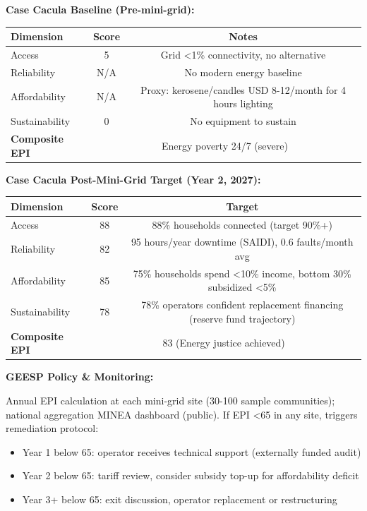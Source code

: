 \documentclass[12pt, a4paper]{article}
\begin{document}
\textbf{Case Cacula Baseline (Pre-mini-grid):}

\begin{center}
\begin{tabular}{lcc}
\toprule
\rowcolor{LightBlue}\textbf{Dimension} & \textbf{Score} & \textbf{Notes} \\
\midrule
Access & 5 & Grid <1\% connectivity, no alternative \\
Reliability & N/A & No modern energy baseline \\
Affordability & N/A & Proxy: kerosene/candles USD 8-12/month for 4 hours lighting \\
Sustainability & 0 & No equipment to sustain \\
\midrule
\textbf{Composite EPI} & \multicolumn{2}{c}{Energy poverty 24/7 (severe)} \\
\bottomrule
\end{tabular}
\end{center}

\textbf{Case Cacula Post-Mini-Grid Target (Year 2, 2027):}

\begin{center}
\begin{tabular}{lcc}
\toprule
\rowcolor{LightBlue}\textbf{Dimension} & \textbf{Score} & \textbf{Target} \\
\midrule
Access & 88 & 88\% households connected (target 90\%+) \\
Reliability & 82 & 95 hours/year downtime (SAIDI), 0.6 faults/month avg \\
Affordability & 85 & 75\% households spend <10\% income, bottom 30\% subsidized <5\% \\
Sustainability & 78 & 78\% operators confident replacement financing (reserve fund trajectory) \\
\midrule
\textbf{Composite EPI} & \multicolumn{2}{c}{83 (Energy justice achieved)} \\
\bottomrule
\end{tabular}
\end{center}

\textbf{GEESP Policy \& Monitoring:}

Annual EPI calculation at each mini-grid site (30-100 sample communities); national aggregation MINEA dashboard (public). If EPI <65 in any site, triggers remediation protocol:

\begin{itemize}
\item Year 1 below 65: operator receives technical support (externally funded audit)
\item Year 2 below 65: tariff review, consider subsidy top-up for affordability deficit
\item Year 3+ below 65: exit discussion, operator replacement or restructuring
\end{itemize}
\end{document}
